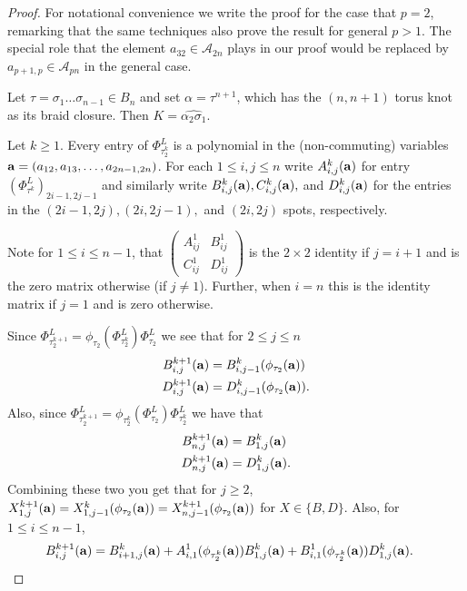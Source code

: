 \documentclass[11pt]{amsart}
\def\cl{\mathcal}
\def\s{{\sigma}}
\newcommand{\al}[1]{\begin{align*}#1\end{align*}}
\theoremstyle{definition}
\begin{document}
\begin{proof}
For notational convenience we write the proof for the case that $p=2$, remarking that the same techniques also prove the result for general $p>1$. The special role that the element $a_{32}\in\cl A_{2n}$ plays in our proof would be replaced by $a_{p+1,p}\in\cl A_{pn}$ in the general case.

Let $\tau = \s_1\ldots\s_{n-1}\in B_n$ and set $\alpha = \tau^{n+1}$, which has the $(n,n+1)$ torus knot as its braid closure. Then $K=\hat{\alpha_2\s_1}$.

Let $k\ge1$. Every entry of $\Phi_{\tau_2^k}^L$ is a polynomial in the (non-commuting) variables ${\bf a} = (a_{12},a_{13},\ldots,a_{2n-1,2n})$. For each $1\le i,j\le n$ write $A_{i,j}^k({\bf a})$ for entry $\left(\Phi_{\tau^k}^L\right)_{2i-1,2j-1}$ and similarly write $B_{i,j}^k({\bf a}), C_{i,j}^k({\bf a}),$ and $D_{i,j}^k({\bf a})$ for the entries in the $(2i-1,2j), (2i,2j-1),$ and $(2i,2j)$ spots, respectively.

Note for $1\le i\le n-1$, that {\small $\begin{pmatrix}A_{ij}^1 & B_{ij}^1\\ C_{ij}^1 & D_{ij}^1\end{pmatrix}$} is the $2\times 2$ identity if $j=i+1$ and is the zero matrix otherwise (if $j\ne1$). Further, when $i=n$ this is the identity matrix if $j=1$ and is zero otherwise.

Since $\Phi_{\tau_2^{k+1}}^L = \phi_{\tau_2}(\Phi_{\tau_2^{k}}^L)\Phi_{\tau_2}^L$ we see that for $2\le j\le n$
  \al{
    B_{i,j}^{k+1}({\bf a})  &= B_{i,j-1}^k(\phi_{\tau_2}({\bf a})) \\
    D_{i,j}^{k+1}({\bf a})  &= D_{i,j-1}^k(\phi_{\tau_2}({\bf a})).
  }
Also, since $\Phi_{\tau_2^{k+1}}^L = \phi_{\tau_2^k}(\Phi_{\tau_2}^L)\Phi_{\tau_2^k}^L$ we have that
  \al{
    B_{n,j}^{k+1}({\bf a})  &= B_{1,j}^k({\bf a}) \\
    D_{n,j}^{k+1}({\bf a})  &= D_{1,j}^k({\bf a}).
  }
Combining these two you get that for $j\ge2$, $X_{1,j}^{k+1}({\bf a}) = X_{1,j-1}^k(\phi_{\tau_2}({\bf a})) = X_{n,j-1}^{k+1}(\phi_{\tau_2}({\bf a}))$ for $X\in\{B,D\}$.
Also, for $1\le i\le n-1$,
  \begin{align}
    B_{i,j}^{k+1}({\bf a})  &= B_{i+1,j}^k({\bf a})+A_{i,1}^1(\phi_{\tau_2^k}({\bf a}))B_{1,j}^k({\bf a})+B_{i,1}^1(\phi_{\tau_2^k}({\bf a}))D_{1,j}^k({\bf a}) \label{eqn2}.
  \end{align}


\end{proof}
\end{document}
